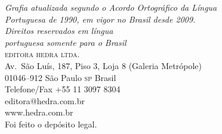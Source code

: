 \bigskip
\textit{Grafia atualizada segundo o Acordo Ortográfico da Língua\\
Portuguesa de 1990, em vigor no Brasil desde 2009.}\\

\vfill
\textit{Direitos reservados em língua\\ 
portuguesa somente para o Brasil}\\

\textsc{editora hedra ltda.}\\
Av.~São Luís, 187, Piso 3, Loja 8 (Galeria Metrópole)\\
01046--912 São Paulo \textsc{sp} Brasil\\
Telefone/Fax +55 11 3097 8304\\\smallskip
editora@hedra.com.br\\
www.hedra.com.br\\

Foi feito o depósito legal.

\endgroup
\pagebreak